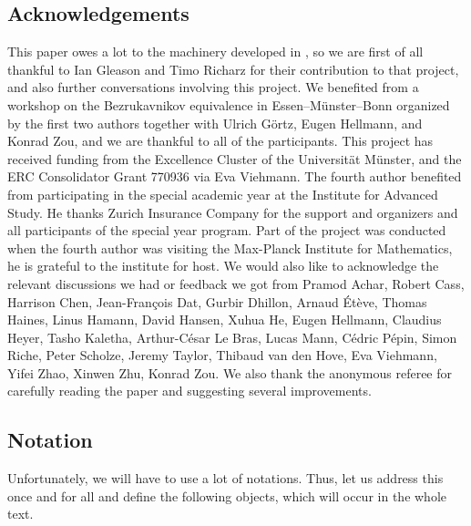 \documentclass[10pt, reqno]{amsart}
\theoremstyle{plain}
\theoremstyle{definition}
\numberwithin{equation}{section}
\begin{document}
	\subsection{Acknowledgements}
	This paper owes a lot to the machinery developed in \cite{AGLR22}, so we are first of all thankful to Ian Gleason and Timo Richarz for their contribution to that project, and also further conversations involving this project. We benefited from a workshop on the Bezrukavnikov equivalence in Essen--Münster--Bonn organized by the first two authors together with Ulrich Görtz, Eugen Hellmann, and Konrad Zou, and we are thankful to all of the participants. This project has received funding from the Excellence Cluster of the Universität Münster, and the ERC Consolidator Grant 770936 via Eva Viehmann. The fourth author benefited from participating in the special academic year at the Institute for Advanced Study. He thanks Zurich Insurance Company for the support and organizers and all participants of the special year program. Part of the project was conducted when the fourth author was visiting the Max-Planck Institute for Mathematics, he is grateful to the institute for host. We would also like to acknowledge the relevant discussions we had or feedback we got from Pramod Achar, Robert Cass, Harrison Chen, Jean-François Dat, Gurbir Dhillon, Arnaud Étève, Thomas Haines, Linus Hamann, David Hansen, Xuhua He, Eugen Hellmann, Claudius Heyer, Tasho Kaletha, Arthur-César Le Bras, Lucas Mann, Cédric Pépin, Simon Riche, Peter Scholze, Jeremy Taylor, Thibaud van den Hove, Eva Viehmann, Yifei Zhao, Xinwen Zhu, Konrad Zou. We also thank the anonymous referee for carefully reading the paper and suggesting several improvements.
	
	\subsection{Notation}
	\label{section-notation}
	
	Unfortunately, we will have to use a lot of notations. Thus, let us address this once and for all and define the following objects, which will occur in the whole text.
	
\end{document}
